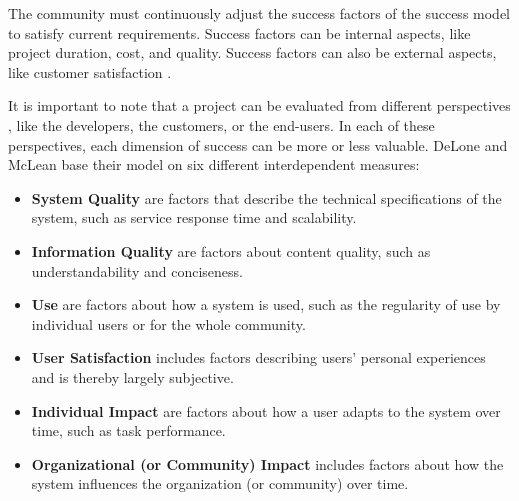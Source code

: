 The community must continuously adjust the success factors of the success model to satisfy current requirements. Success factors can be internal aspects, like project duration, cost, and quality. Success factors can also be external aspects, like customer satisfaction \cite{AgRa06}.

It is important to note that a project can be evaluated from different perspectives \cite{RKJa15}, like the developers, the customers, or the end-users.
In each of these perspectives, each dimension of success can be more or less valuable.
DeLone and McLean \cite{DeMc92} base their model on six different interdependent measures:
\begin{itemize}
    \item \textbf{System Quality} are factors that describe the technical specifications of the system, such as service response time and scalability.
    \item \textbf{Information Quality} are factors about content quality, such as understandability and conciseness.
    \item \textbf{Use} are factors about how a system is used, such as the regularity of use by individual users or for the whole community.
    \item \textbf{User Satisfaction} includes factors describing users' personal experiences and is thereby largely subjective.
    \item \textbf{Individual Impact} are factors about how a user adapts to the system over time, such as task performance.
    \item \textbf{Organizational (or Community) Impact} includes factors about how the system influences the organization (or community) over time.
\end{itemize}
